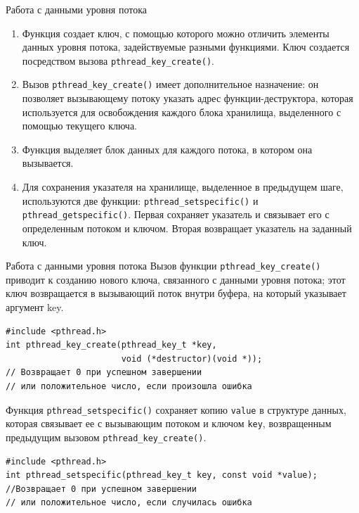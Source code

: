 \documentclass{beamer}
\begin{document}
\begin{frame}{Работа с данными уровня потока}
    \begin{enumerate}
        \item Функция создает ключ, с помощью которого можно отличить элементы данных уровня потока, задействуемые разными функциями. Ключ создается посредством вызова \texttt{pthread\_key\_create()}.
        \item Вызов \texttt{pthread\_key\_create()} имеет дополнительное назначение: он позволяет вызывающему потоку указать адрес функции-деструктора, которая используется для освобождения каждого блока хранилища, выделенного с помощью текущего ключа.
        \item Функция выделяет блок данных для каждого потока, в котором она вызывается.
        \item Для сохранения указателя на хранилище, выделенное в предыдущем шаге, используются две функции: \texttt{pthread\_setspecific()} и \texttt{pthread\_getspecific()}. Первая сохраняет указатель и связывает его с определенным потоком и ключом. Вторая возвращает указатель на заданный ключ.
    \end{enumerate}
\end{frame}

\begin{frame}[fragile]{Работа с данными уровня потока}
    Вызов функции \texttt{pthread\_key\_create()} приводит к созданию нового ключа, связанного с данными уровня потока; этот ключ возвращается в вызывающий поток внутри буфера, на который указывает аргумент key.
    \begin{verbatim}
#include <pthread.h>
int pthread_key_create(pthread_key_t *key, 
                       void (*destructor)(void *));
// Возвращает 0 при успешном завершении 
// или положительное число, если произошла ошибка
    \end{verbatim}
    
    Функция \texttt{pthread\_setspecific()} сохраняет копию \texttt{value} в структуре данных, которая связывает ее с вызывающим потоком и ключом \texttt{key}, возвращенным предыдущим вызовом \texttt{pthread\_key\_create()}.
    \begin{verbatim}
#include <pthread.h>
int pthread_setspecific(pthread_key_t key, const void *value);
//Возвращает 0 при успешном завершении 
// или положительное число, если случилась ошибка
    \end{verbatim}
\end{frame}
\end{document}
